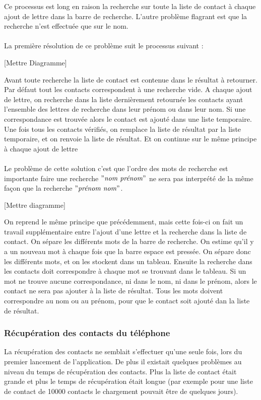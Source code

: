 Ce processus est long en raison la recherche sur toute la liste de contact à chaque ajout de lettre dans la barre de recherche. L'autre problème flagrant est que la recherche n'est effectuée que sur le nom.\\\\

La première résolution de ce problème suit le processus suivant :

[Mettre Diagramme]

Avant toute recherche la liste de contact est contenue dans le résultat à retourner. Par défaut tout les contacts correspondent à une recherche vide. A chaque ajout de lettre, on recherche dans la liste dernièrement retournée les contacts ayant l'ensemble des lettres de recherche dans leur prénom ou dans leur nom. Si une correspondance est trouvée alors le contact est ajouté dans une liste temporaire. Une fois tous les contacts vérifiés, on remplace la liste de résultat par la liste temporaire, et on renvoie la liste de résultat. Et on continue sur le même principe à chaque ajout de lettre\\\\

Le problème de cette solution c'est que l'ordre des mots de recherche est importante faire une recherche $"\textit{nom prénom}"$ ne sera pas interprété de la même façon que la recherche $"\textit{prénom nom}"$.

[Mettre diagramme]

On reprend le même principe que précédemment, mais cette fois-ci on fait un travail supplémentaire entre l'ajout d'une lettre et la recherche dans la liste de contact. On sépare les différents mots de la barre de recherche. On estime qu'il y a un nouveau mot à chaque fois que la barre espace est pressée. On sépare donc les différents mots, et on les stockent dans un tableau. Ensuite la recherche dans les contacts doit correspondre à chaque mot se trouvant dans le tableau. Si un mot ne trouve aucune correspondance, ni dans le nom, ni dans le prénom, alors le contact ne sera pas ajouter à la liste de résultat. Tous les mots doivent correspondre au nom ou au prénom, pour que le contact soit ajouté dan la liste de résultat.

\subsubsection{Récupération des contacts du téléphone}

La récupération des contacts ne semblait s'effectuer qu'une seule fois, lors du premier lancement de l'application. De plus il existait quelques problèmes au niveau du temps de récupération des contacts. Plus la liste de contact était grande et plus le temps de récupération était longue (par exemple pour une liste de contact de 10000 contacts le chargement pouvait être de quelques jours).\\

